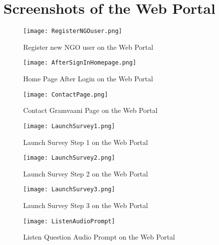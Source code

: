 \chapter{Screenshots of the Web Portal}

\begin{figure}[H]
    \centering
	\texttt{[image: RegisterNGOuser.png]}
    \caption{Register new NGO user on the Web Portal}
    \label{fig:Register new NGO user on the Web Portal}
\end{figure}

\begin{figure}[H]
    \centering
	\texttt{[image: AfterSignInHomepage.png]}
    \caption{Home Page After Login on the Web Portal}
    \label{fig:Home Page After Login on the Web Portal}
\end{figure}


\begin{figure}[H]
    \centering
	\texttt{[image: ContactPage.png]}
    \caption{Contact Gramvaani Page on the Web Portal}
    \label{fig:Contact Gramvaani Page on the Web Portal}
\end{figure}

\begin{figure}[H]
    \centering
	\texttt{[image: LaunchSurvey1.png]}
    \caption{Launch Survey Step 1 on the Web Portal}
    \label{fig:Launch Survey Step 1 on the Web Portal}
\end{figure}

\begin{figure}[H]
    \centering
	\texttt{[image: LaunchSurvey2.png]}
    \caption{Launch Survey Step 2 on the Web Portal}
    \label{fig:Launch Survey Step 2 on the Web Portal}
\end{figure}

\begin{figure}[H]
    \centering
	\texttt{[image: LaunchSurvey3.png]}
    \caption{Launch Survey Step 3 on the Web Portal}
    \label{fig:Launch Survey Step 3 on the Web Portal}
\end{figure}

\begin{figure}[H]
    \centering
	\texttt{[image: ListenAudioPrompt]}
    \caption{Listen Question Audio Prompt on the Web Portal}
    \label{fig:Listen Question Audio Prompt on the Web Portal}
\end{figure}


